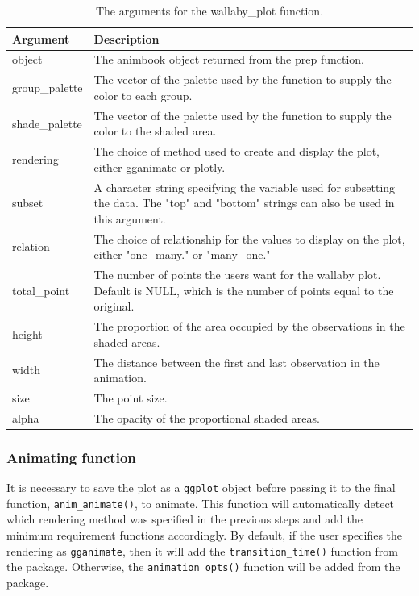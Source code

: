 \begin{table}

\caption{\label{tab:unnamed-chunk-8}The arguments for the wallaby\_plot function.}
\centering
\begin{tabular}[t]{l|>{\raggedright\arraybackslash}p{30em}}
\hline
Argument & Description\\
\hline
object & The animbook object returned from the prep function.\\
\hline
group\_palette & The vector of the palette used by the function to supply the color to each group.\\
\hline
shade\_palette & The vector of the palette used by the function to supply the color to the shaded area.\\
\hline
rendering & The choice of method used to create and display the plot, either gganimate or plotly.\\
\hline
subset & A character string specifying the variable used for subsetting the data. The "top" and "bottom" strings can also be used in this argument.\\
\hline
relation & The choice of relationship for the values to display on the plot, either "one\_many." or "many\_one."\\
\hline
total\_point & The number of points the users want for the wallaby plot. Default is NULL, which is the number of points equal to the original.\\
\hline
height & The proportion of the area occupied by the observations in the shaded areas.\\
\hline
width & The distance between the first and last observation in the animation.\\
\hline
size & The point size.\\
\hline
alpha & The opacity of the proportional shaded areas.\\
\hline
\end{tabular}
\end{table}

\hypertarget{animating-function}{%
\subsubsection{Animating function}\label{animating-function}}

It is necessary to save the plot as a \texttt{ggplot} object before passing it to the final function, \texttt{anim\_animate()}, to animate. This function will automatically detect which rendering method was specified in the previous steps and add the minimum requirement functions accordingly. By default, if the user specifies the rendering as \texttt{gganimate}, then it will add the \texttt{transition\_time()} function from the  package. Otherwise, the \texttt{animation\_opts()} function will be added from the  package.

